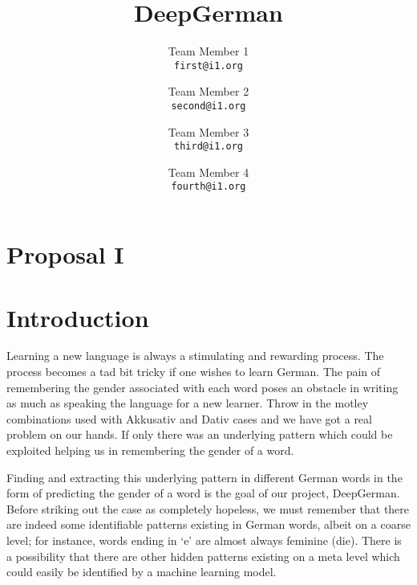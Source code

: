 \documentclass[10pt,twocolumn,letterpaper]{article}
\begin{document}
\title{DeepGerman}

\author{Team Member 1\\
{\tt\small first@i1.org}
\and
Team Member 2\\
{\tt\small second@i1.org}
\and
Team Member 3\\
{\tt\small third@i1.org}
\and
Team Member 4\\
{\tt\small fourth@i1.org}
}

\maketitle

%
%
\section*{Proposal I}
\section{Introduction}
    Learning a new language is always a stimulating and rewarding process. The process becomes a tad bit tricky if one wishes to learn German. The pain of remembering the gender associated with each word poses an obstacle in writing as much as speaking the language for a new learner. Throw in the motley combinations used with Akkusativ and Dativ cases and we have got a real problem on our hands. If only there was an underlying pattern which could be exploited helping us in remembering the gender of a word.
    
    Finding and extracting this underlying pattern in different German words in the form of predicting the gender of a word is the goal of our project, DeepGerman. Before striking out the case as completely hopeless, we must remember that there are indeed some identifiable patterns existing in German words, albeit on a coarse level; for instance, words ending in ‘e’ are almost always feminine (die). There is a possibility that there are other hidden patterns existing on a meta level which could easily be identified by a machine learning model.
\end{document}

